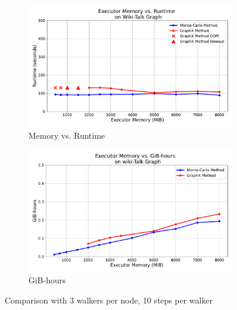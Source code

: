 \begin{figure}[H]
    \centering
    \begin{subfigure}[t]{0.73\linewidth}
        \centering
        \includegraphics[width=\linewidth]{images/plots/wiki-Talk/memory_vs_runtime_3wpn_v2.pdf}
        \caption{Memory vs. Runtime}
        \label{fig:wikirun}
    \end{subfigure}\hfill
    \begin{subfigure}[t]{0.73\linewidth}
        \centering
        \includegraphics[width=\linewidth]{images/plots/wiki-Talk/gbhrs_nodes_v2.pdf}
        \caption{GiB-hours}
        \label{fig:wikigibhrs}
    \end{subfigure}
    \caption{Comparison with 3 walkers per node, 10 steps per walker}
    \label{fig:wiki-comparison}
\end{figure}

